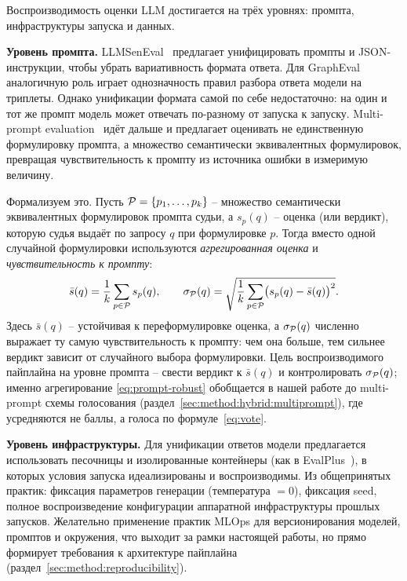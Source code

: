 Воспроизводимость оценки LLM достигается на трёх уровнях: промпта,
инфраструктуры запуска и данных.

\textbf{Уровень промпта.}
LLMSenEval~\cite{yan2025llmsemeval} предлагает унифицировать промпты и
JSON-инструкции, чтобы убрать вариативность формата ответа.
Для GraphEval~\cite{sansford2024grapheval} аналогичную роль играет
однозначность правил разбора ответа модели на триплеты.
Однако унификации формата самой по себе недостаточно: на один и тот же
промпт модель может отвечать по-разному от запуска к запуску.
Multi-prompt evaluation~\cite{mizrahi2024stateofwhatart} идёт дальше и
предлагает оценивать не единственную формулировку промпта, а множество
семантически эквивалентных формулировок, превращая чувствительность к
промпту из источника ошибки в измеримую величину.

Формализуем это. Пусть $\mathcal{P} = \{p_1, \dots, p_k\}$ -- множество
семантически эквивалентных формулировок промпта судьи, а $s_{p}(q)$ --
оценка (или вердикт), которую судья выдаёт по запросу $q$ при
формулировке $p$. Тогда вместо одной случайной формулировки используются
\emph{агрегированная оценка} и \emph{чувствительность к промпту}:
\begin{equation}
    \label{eq:prompt-robust}
    \bar{s}(q) = \frac{1}{k}\sum_{p \in \mathcal{P}} s_{p}(q),
    \qquad
    \sigma_{\mathcal{P}}(q) =
        \sqrt{\frac{1}{k}\sum_{p \in \mathcal{P}}
            \bigl(s_{p}(q) - \bar{s}(q)\bigr)^2}.
\end{equation}
Здесь $\bar{s}(q)$ -- устойчивая к переформулировке оценка, а
$\sigma_{\mathcal{P}}(q)$ численно выражает ту самую чувствительность к
промпту: чем она больше, тем сильнее вердикт зависит от случайного
выбора формулировки. Цель воспроизводимого пайплайна на уровне промпта
-- свести вердикт к $\bar{s}(q)$ и контролировать $\sigma_{\mathcal{P}}(q)$;
именно агрегирование \eqref{eq:prompt-robust} обобщается в нашей работе
до multi-prompt схемы голосования (раздел~\ref{sec:method:hybrid:multiprompt}),
где усредняются не баллы, а голоса по формуле~\eqref{eq:vote}.

\textbf{Уровень инфраструктуры.}
Для унификации ответов модели предлагается использовать песочницы и
изолированные контейнеры (как в EvalPlus~\cite{liu2023evalplus}), в
которых условия запуска идеализированы и воспроизводимы.
Из общепринятых практик: фиксация параметров генерации (температура
$=0$), фиксация seed, полное воспроизведение конфигурации аппаратной
инфраструктуры прошлых запусков.
Желательно применение практик MLOps для версионирования моделей,
промптов и окружения, что выходит за рамки настоящей работы, но прямо
формирует требования к архитектуре пайплайна
(раздел~\ref{sec:method:reproducibility}).

